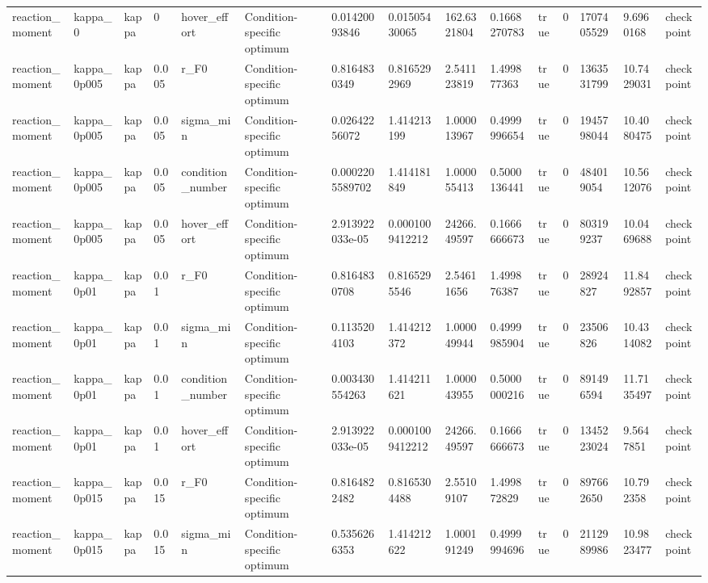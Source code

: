 \begin{tabular}{@{}lllllllllllllll@{}}
reaction\_moment & kappa\_0 & kappa & 0 & hover\_effort & Condition-specific optimum & 0.01420093846 & 0.01505430065 & 162.6321804 & 0.1668270783 & true & 0 & 1707405529 & 9.6960168 & checkpoint \\
reaction\_moment & kappa\_0p005 & kappa & 0.005 & r\_F0 & Condition-specific optimum & 0.8164830349 & 0.8165292969 & 2.541123819 & 1.499877363 & true & 0 & 1363531799 & 10.7429031 & checkpoint \\
reaction\_moment & kappa\_0p005 & kappa & 0.005 & sigma\_min & Condition-specific optimum & 0.02642256072 & 1.414213199 & 1.000013967 & 0.4999996654 & true & 0 & 1945798044 & 10.4080475 & checkpoint \\
reaction\_moment & kappa\_0p005 & kappa & 0.005 & condition\_number & Condition-specific optimum & 0.0002205589702 & 1.414181849 & 1.000055413 & 0.5000136441 & true & 0 & 484019054 & 10.5612076 & checkpoint \\
reaction\_moment & kappa\_0p005 & kappa & 0.005 & hover\_effort & Condition-specific optimum & 2.913922033e-05 & 0.0001009412212 & 24266.49597 & 0.1666666673 & true & 0 & 803199237 & 10.0469688 & checkpoint \\
reaction\_moment & kappa\_0p01 & kappa & 0.01 & r\_F0 & Condition-specific optimum & 0.8164830708 & 0.8165295546 & 2.54611656 & 1.499876387 & true & 0 & 28924827 & 11.8492857 & checkpoint \\
reaction\_moment & kappa\_0p01 & kappa & 0.01 & sigma\_min & Condition-specific optimum & 0.1135204103 & 1.414212372 & 1.000049944 & 0.4999985904 & true & 0 & 23506826 & 10.4314082 & checkpoint \\
reaction\_moment & kappa\_0p01 & kappa & 0.01 & condition\_number & Condition-specific optimum & 0.003430554263 & 1.414211621 & 1.000043955 & 0.5000000216 & true & 0 & 891496594 & 11.7135497 & checkpoint \\
reaction\_moment & kappa\_0p01 & kappa & 0.01 & hover\_effort & Condition-specific optimum & 2.913922033e-05 & 0.0001009412212 & 24266.49597 & 0.1666666673 & true & 0 & 1345223024 & 9.5647851 & checkpoint \\
reaction\_moment & kappa\_0p015 & kappa & 0.015 & r\_F0 & Condition-specific optimum & 0.8164822482 & 0.8165304488 & 2.55109107 & 1.499872829 & true & 0 & 897662650 & 10.792358 & checkpoint \\
reaction\_moment & kappa\_0p015 & kappa & 0.015 & sigma\_min & Condition-specific optimum & 0.5356266353 & 1.414212622 & 1.000191249 & 0.4999994696 & true & 0 & 2112989986 & 10.9823477 & checkpoint \\

\end{tabular}

